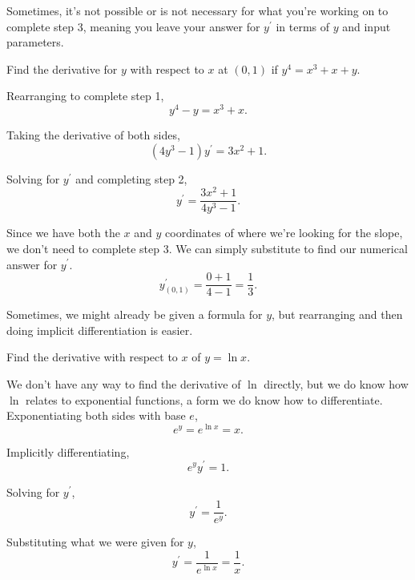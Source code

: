 Sometimes, it's not possible or is not necessary for what you're working on to complete step 3, meaning you leave your answer for $y^\prime$ in terms of $y$ and input parameters.
\begin{example}
	Find the derivative for $y$ with respect to $x$ at $(0,1)$ if $y^4 = x^3 + x + y$.
\end{example}
\begin{answer}
	Rearranging to complete step 1,
	\begin{equation*}
		y^4 - y = x^3 + x.
	\end{equation*}
	
	Taking the derivative of both sides,
	\begin{equation*}
		(4y^3 - 1)y^\prime = 3x^2 + 1.
	\end{equation*}
	
	Solving for $y^\prime$ and completing step 2,
	\begin{equation*}
		y^\prime = \frac{3x^2 + 1}{4y^3 - 1}.
	\end{equation*}
	
	Since we have both the $x$ and $y$ coordinates of where we're looking for the slope, we don't need to complete step 3.
	We can simply substitute to find our numerical answer for $y^\prime$.
	\begin{equation*}
		y^\prime_{(0,1)} = \frac{0 + 1}{4 - 1} = \frac{1}{3}.
	\end{equation*}
\end{answer}

Sometimes, we might already be given a formula for $y$, but rearranging and then doing implicit differentiation is easier.
\begin{example}
	Find the derivative with respect to $x$ of $y = \ln{x}$.
\end{example}
\begin{answer}
	We don't have any way to find the derivative of $\ln$ directly, but we do know how $\ln$ relates to exponential functions, a form we do know how to differentiate.
	Exponentiating both sides with base $e$,
	\begin{equation*}
		e^y = e^{\ln{x}} = x.
	\end{equation*}
	 
	Implicitly differentiating,
	\begin{equation*}
		e^{y}y^\prime = 1.
	\end{equation*}
	
	Solving for $y^\prime$,
	\begin{equation*}
		y^\prime = \frac{1}{e^y}.
	\end{equation*}
	
	Substituting what we were given for $y$,
	\begin{equation*}
		y^\prime = \frac{1}{e^{\ln{x}}} = \frac{1}{x}.
	\end{equation*}
\end{answer}

